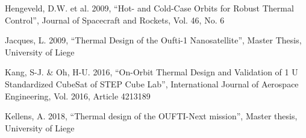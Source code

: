 \documentclass[]{aastex62}
\begin{document}
Hengeveld, D.W. et al. 2009, ``Hot- and Cold-Case Orbits for Robust Thermal Control'', Journal of Spacecraft and 
     \phantom{xxxxxx} Rockets,  Vol. 46, No. 6 

Jacques, L. 2009, ``Thermal Design of the Oufti-1 Nanosatellite'', Master Thesis, University of Liege

Kang, S-J. \& Oh, H-U. 2016, ``On-Orbit Thermal Design and Validation of 1 U Standardized CubeSat of STEP 
\phantom{xxxxxx}  Cube Lab'', 
        International Journal of Aerospace Engineering, Vol. 2016, Article 4213189

Kellens, A. 2018, ``Thermal design of the OUFTI-Next mission'', Master thesis, University of Liege
\end{document}

